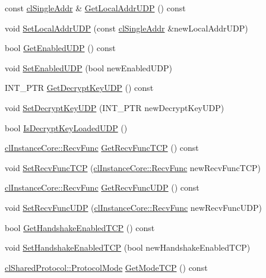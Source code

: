 \begin{DoxyCompactItemize}
\item 
const \hyperlink{classcl_single_addr}{clSingleAddr} \& \hyperlink{classcl_instance_profile_a19b331334b83cdf101d6db90df9b1755}{GetLocalAddrUDP} () const 
\item 
void \hyperlink{classcl_instance_profile_a662a7044e253ff8722e69b305f2c979a}{SetLocalAddrUDP} (const \hyperlink{classcl_single_addr}{clSingleAddr} \&newLocalAddrUDP)
\item 
bool \hyperlink{classcl_instance_profile_a890c37125ac1c496aef5c4003a35160e}{GetEnabledUDP} () const 
\item 
void \hyperlink{classcl_instance_profile_a6e73ed3d57d2c3a2b2ce7f4dba312caf}{SetEnabledUDP} (bool newEnabledUDP)
\item 
INT\_\-PTR \hyperlink{classcl_instance_profile_a109e2f743649d74e390a5270d7e75798}{GetDecryptKeyUDP} () const 
\item 
void \hyperlink{classcl_instance_profile_a8e52937a15b094f7e60b4f34684a8e4c}{SetDecryptKeyUDP} (INT\_\-PTR newDecryptKeyUDP)
\item 
bool \hyperlink{classcl_instance_profile_ace2e8c7cd5379669362bceaf9b9e54e4}{IsDecryptKeyLoadedUDP} ()
\item 
\hyperlink{classcl_instance_core_afa96c2a2c0b26b6a9256b87798bf9587}{clInstanceCore::RecvFunc} \hyperlink{classcl_instance_profile_ae02ec718bc88686b473a720b13580ba2}{GetRecvFuncTCP} () const 
\item 
void \hyperlink{classcl_instance_profile_a9db3e441ba8279a392ad238391732c87}{SetRecvFuncTCP} (\hyperlink{classcl_instance_core_afa96c2a2c0b26b6a9256b87798bf9587}{clInstanceCore::RecvFunc} newRecvFuncTCP)
\item 
\hyperlink{classcl_instance_core_afa96c2a2c0b26b6a9256b87798bf9587}{clInstanceCore::RecvFunc} \hyperlink{classcl_instance_profile_a4f6729b6fdcbd813c3843f8513d570ca}{GetRecvFuncUDP} () const 
\item 
void \hyperlink{classcl_instance_profile_a289d594c4f6973aa55fa4984aa5b6336}{SetRecvFuncUDP} (\hyperlink{classcl_instance_core_afa96c2a2c0b26b6a9256b87798bf9587}{clInstanceCore::RecvFunc} newRecvFuncUDP)
\item 
bool \hyperlink{classcl_instance_profile_aaaa6313e6f2fbf439faa4f0d6765e5ca}{GetHandshakeEnabledTCP} () const 
\item 
void \hyperlink{classcl_instance_profile_a7dda3da4c81fedfecde7d8a579494f20}{SetHandshakeEnabledTCP} (bool newHandshakeEnabledTCP)
\item 
\hyperlink{classcl_shared_protocol_a4b0b9c82b8ae4eee78c6308c35afd47b}{clSharedProtocol::ProtocolMode} \hyperlink{classcl_instance_profile_a87e7c5e199c9930e089e2f1945e93d29}{GetModeTCP} () const 

\end{DoxyCompactItemize}
